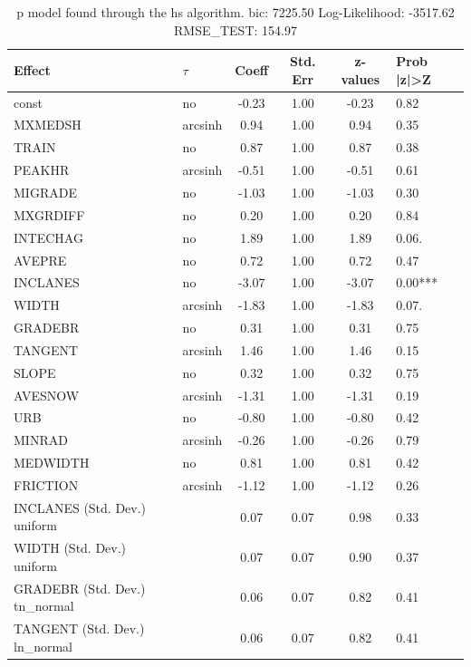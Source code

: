 \begin{table}
	\caption{p model found through the hs algorithm. bic: 7225.50 Log-Likelihood: -3517.62 RMSE_TEST: 154.97}
	\begin{center}
		\begin{tabular}{|l|l|c|c|c|l|}
			\hline
			Effect & $\tau$ & Coeff & Std. Err & z-values & Prob |z|>Z \\
			\hline
			const & no & -0.23 & 1.00 & -0.23 & 0.82 \\
			\hline
			MXMEDSH & arcsinh & 0.94 & 1.00 & 0.94 & 0.35 \\
			\hline
			TRAIN & no & 0.87 & 1.00 & 0.87 & 0.38 \\
			\hline
			PEAKHR & arcsinh & -0.51 & 1.00 & -0.51 & 0.61 \\
			\hline
			MIGRADE & no & -1.03 & 1.00 & -1.03 & 0.30 \\
			\hline
			MXGRDIFF & no & 0.20 & 1.00 & 0.20 & 0.84 \\
			\hline
			INTECHAG & no & 1.89 & 1.00 & 1.89 & 0.06. \\
			\hline
			AVEPRE & no & 0.72 & 1.00 & 0.72 & 0.47 \\
			\hline
			INCLANES & no & -3.07 & 1.00 & -3.07 & 0.00*** \\
			\hline
			WIDTH & arcsinh & -1.83 & 1.00 & -1.83 & 0.07. \\
			\hline
			GRADEBR & no & 0.31 & 1.00 & 0.31 & 0.75 \\
			\hline
			TANGENT & arcsinh & 1.46 & 1.00 & 1.46 & 0.15 \\
			\hline
			SLOPE & no & 0.32 & 1.00 & 0.32 & 0.75 \\
			\hline
			AVESNOW & arcsinh & -1.31 & 1.00 & -1.31 & 0.19 \\
			\hline
			URB & no & -0.80 & 1.00 & -0.80 & 0.42 \\
			\hline
			MINRAD & arcsinh & -0.26 & 1.00 & -0.26 & 0.79 \\
			\hline
			MEDWIDTH & no & 0.81 & 1.00 & 0.81 & 0.42 \\
			\hline
			FRICTION & arcsinh & -1.12 & 1.00 & -1.12 & 0.26 \\
			\hline
			INCLANES (Std. Dev.) uniform &  & 0.07 & 0.07 & 0.98 & 0.33 \\
			\hline
			WIDTH (Std. Dev.) uniform &  & 0.07 & 0.07 & 0.90 & 0.37 \\
			\hline
			GRADEBR (Std. Dev.) tn_normal &  & 0.06 & 0.07 & 0.82 & 0.41 \\
			\hline
			TANGENT (Std. Dev.) ln_normal &  & 0.06 & 0.07 & 0.82 & 0.41 \\

\end{tabular}
\end{center}
\end{table}
